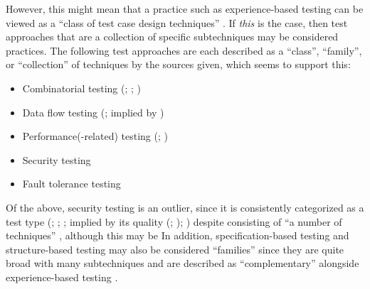 \ifnotpaper
    \label{classFamilyFlaw}
    However, this might mean that a practice such as experience-based testing
    can be viewed as a ``class of test case design techniques''
    \citep[p.~4]{IEEE2022}. If \emph{this} is the case, then test approaches
    that are a collection of specific subtechniques may be considered
    practices. The following test approaches are each described as a ``class'',
    ``family'', or ``collection'' of techniques by the sources given, which
    seems to support this:
    \begin{itemize}
        \item Combinatorial testing (\citealp[p.~3]{IEEE2022};
              \citeyear[p.~2]{IEEE2021}; \citealp[p.~5-11]{SWEBOK2024})
        \item Data flow testing (\citeyear[p.~3]{IEEE2021};
              implied by \citealp[p.~5-13]{SWEBOK2024})
        \item Performance(-related) testing (\citealp[p.~38]{IEEE2021};
              \perfAsFamily*{})
        \item Security testing \citep[implied by][p.~40]{IEEE2021}
        \item Fault tolerance testing \citep[implied by][p.~4\=/11]{SWEBOK2024}
    \end{itemize}
    Of the above, security testing is an outlier, since it is consistently
    categorized as a test type (\citealp[pp.~9, 22, 26--27]{IEEE2022};
    \citeyear[pp.~7, 40, Tab.~A.1]{IEEE2021}; \citeyear[p.~405]{IEEE2017}%
    ; implied by its quality (\citealp{ISO_IEC2023a};
    \citealp[p.~13-4]{SWEBOK2024}); \citealp[p.~53]{Firesmith2015}) despite
    consisting of ``a number of techniques'' \cite[p.~40]{IEEE2021}, although
    this may be  In addition, specification-based
    testing and structure-based testing may also be considered ``families''
    since they are quite broad with many subtechniques and are described as
    ``complementary'' alongside experience-based testing
    \citep[p.~8, Fig.~2]{IEEE2021}.
\fi

